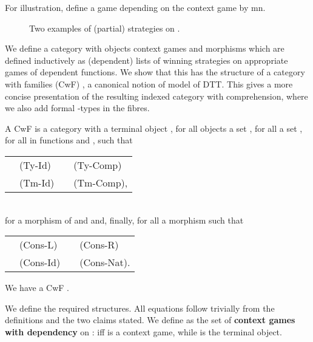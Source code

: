 \documentclass[runningheads,a4paper]{llncs}
\renewcommand{\emph}[1]{\textbf{#1}}
\begin{document}
For illustration, define a game  depending on the context game  by mn.\vspace{-10pt}
\begin{figure}[htb]\vspace{-10pt}
\centering\resizebox{\linewidth}{!}{

}
\caption{Two examples of (partial) strategies on .}\vspace{-30pt}
\end{figure}

We define a category  with objects context games and morphisms which are defined inductively as (dependent) lists of winning strategies on appropriate games of dependent functions. We show that this has the structure of a category with families (CwF) \cite{hofmann1997syntax}, a canonical notion of model of \textsf{DTT}. This gives a more concise presentation of the resulting indexed category with comprehension, where we also add formal -types in the fibres.

\begin{definition}[CwF] A CwF is a category  with a terminal object , for all objects  a set , for all  a set , for all  in  functions  and , such that
\begin{tabular}{llll}
 & (Ty-Id)\hspace{60pt} & \hspace{23pt} & (Ty-Comp)\\
 \hspace{23pt} & (Tm-Id)&  & (Tm-Comp),
\end{tabular}\\
for  a morphism  of  and  and, finally, for all  a morphism  such that\linebreak
\begin{tabular}{llll}
 & (Cons-L)\hspace{35pt} & 
&(Cons-R)  \\
 \hspace{7pt} &(Cons-Id) &
 \hspace{7pt} & (Cons-Nat).
\end{tabular}

\end{definition}

\begin{theorem}We have a CwF .
\end{theorem}We define the required structures. All equations follow trivially from the definitions and the two claims stated.
We define  as the set of \emph{context games with dependency} on :  iff  is a context game, while  is the terminal object.
\end{document}
